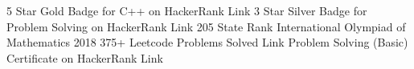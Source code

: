 


\begin{cvhonors}

  \cvhonor
    {5 Star} %
    {Gold Badge for C++ on HackerRank} %
    {Link} %
    {} %
  \cvhonor
    {3 Star} %
    {Silver Badge for Problem Solving on HackerRank} %
    {Link} %
    {} %
  \cvhonor
    {205 State Rank} %
    {International Olympiad of Mathematics 2018} %
    {} %
    {} %
  \cvhonor
    {375+} %
    {Leetcode Problems Solved} %
    {Link} %
    {} %
  \cvhonor
    {Problem Solving (Basic)} %
    {Certificate on HackerRank} %
    {Link} %
    {} %
\end{cvhonors}